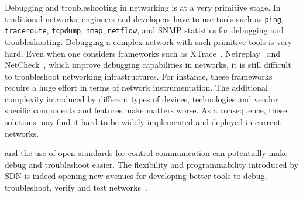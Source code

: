 
Debugging and troubleshooting in networking is at a very primitive stage.
In traditional networks, engineers and developers have 
to use tools such as \texttt{ping}, \texttt{traceroute}, \texttt{tcpdump}, \texttt{nmap}, 
\texttt{netflow}, and SNMP statistics for debugging and troubleshooting.
Debugging a complex 
network with such primitive tools is very hard.
Even when one considers frameworks such as
XTrace~\cite{fonseca2007}, Netreplay~\cite{anand2010} 
and NetCheck~\cite{zhuang2014}, which improve debugging capabilities in networks, it is still difficult 
to troubleshoot networking infrastructures. For instance, these frameworks require a huge effort in terms of 
network instrumentation. The additional complexity introduced 
by different types of devices, technologies and vendor specific components and features make matters worse.
As a consequence, 
these solutions may find it hard to be widely implemented and deployed in current networks.

 and the use of open standards for control communication can potentially make debug and troubleshoot easier.
The flexibility and 
programmability introduced by SDN is indeed opening new avenues for developing better tools to debug, troubleshoot, 
verify and test networks~\cite{handigol2012-1,wundsam2011,canini2012-1,rotsos2012-1,al-shaer2010,khurshid2012,kuzniar2012,altekar2010,kuzniar2012}.

